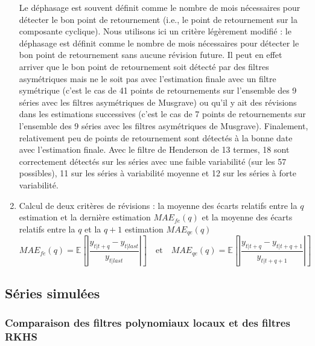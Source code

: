 \documentclass[
  12pt,
  french,
  12pt,a4paper]{article}
\newcommand\1{\mathds{1}}
\begin{document}
\begin{enumerate}
  Le déphasage est souvent définit comme le nombre de mois nécessaires pour détecter le bon point de retournement (i.e., le point de retournement sur la composante cyclique).
  Nous utilisons ici un critère légèrement modifié : le déphasage est définit comme le nombre de mois nécessaires pour détecter le bon point de retournement sans aucune révision future.
  Il peut en effet arriver que le bon point de retournement soit détecté par des filtres asymétriques mais ne le soit pas avec l'estimation finale avec un filtre symétrique (c'est le cas de 41 points de retournements sur l'ensemble des 9 séries avec les filtres asymétriques de Musgrave) ou qu'il y ait des révisions dans les estimations successives (c'est le cas de 7 points de retournements sur l'ensemble des 9 séries avec les filtres asymétriques de Musgrave).
  Finalement, relativement peu de points de retournement sont détectés à la bonne date avec l'estimation finale.
  Avec le filtre de Henderson de 13 termes, 18 sont correctement détectés sur les séries avec une faible variabilité (sur les 57 possibles), 11 sur les séries à variabilité moyenne et 12 sur les séries à forte variabilité.
\item
  Calcul de deux critères de révisions : la moyenne des écarts relatifs entre la \(q\)\ieme{} estimation et la dernière estimation \(MAE_{fe}(q)\) et la moyenne des écarts relatifs entre la \(q\)\ieme{} et la \(q+1\)\ieme{} estimation \(MAE_{qe}(q)\)
  \[
  MAE_{fe}(q)=\mathbb E\left[
  \left|\frac{
  y_{t|t+q} -  y_{t|last}
  }{
   y_{t|last}
  }\right|
  \right]
  \quad\text{et}\quad
  MAE_{qe}(q)=\mathbb E\left[
  \left|\frac{
  y_{t|t+q} - y_{t|t+q+1}
  }{
  y_{t|t+q+1}
  }\right|
  \right]
  \]
\end{enumerate}

\hypertarget{suxe9ries-simuluxe9es}{%
\subsection{Séries simulées}\label{suxe9ries-simuluxe9es}}

\hypertarget{comparaison-des-filtres-polynomiaux-locaux-et-des-filtres-rkhs}{%
\subsubsection{Comparaison des filtres polynomiaux locaux et des filtres RKHS}\label{comparaison-des-filtres-polynomiaux-locaux-et-des-filtres-rkhs}}
\end{document}

